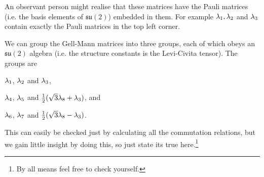 An observant person might realise that these matrices have the Pauli matrices (i.e. the basis elements of $\mathfrak{su}(2)$) embedded in them. For example $\lambda_1,\lambda_2$ and $\lambda_3$ contain exactly the Pauli matrices in the top left corner. 

\bcl 
    We can group the Gell-Mann matrices into three groups, each of which obeys an $\mathfrak{su}(2)$ algebra (i.e. the structure constants is the Levi-Civita tensor). The groups are 
    \ben[label=(\roman*)]
        \item $\lambda_1$, $\lambda_2$ and $\lambda_3$,
        \item $\lambda_4$, $\lambda_5$ and $\frac{1}{2}(\sqrt{3}\lambda_8+\lambda_3)$, and 
        \item $\lambda_6$, $\lambda_7$ and $\frac{1}{2}(\sqrt{3}\lambda_8-\lambda_3)$.
    \een 
\ecl 

\bq 
    This can easily be checked just by calculating all the commutation relations, but we gain little insight by doing this, so just state its true here.\footnote{By all means feel free to check yourself.}
\eq 

